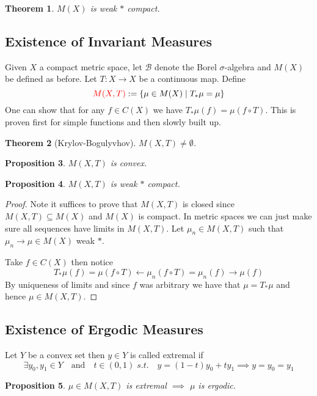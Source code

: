 \documentclass[11pt]{article}
\newcommand{\defeq}{:=}
\newcommand{\relmiddle}[1]{\mathrel{}\middle#1\mathrel{}}
\newcommand{\rmv}{\relmiddle|}
\newenvironment{defin}
	{\begin{mdframed}[backgroundcolor=white, roundcorner=5pt, linewidth=1pt]}
	{\end{mdframed}}
\newcommand{\mdf}[1]{{\color{red} #1}}
\newtheorem{prop}{Proposition}[section]
\newtheorem{theorem}[prop]{Theorem}
\begin{document}
\begin{theorem}
$M(X)$ is weak $\ast$ compact.
\end{theorem}

\subsection{Existence of Invariant Measures}
Given $X$ a compact metric space, let $\mathcal{B}$ denote the Borel $\sigma$-algebra and $M(X)$ be defined as before.
Let $T:X\to X$ be a continuous map.
Define
\[
	\mdf{M(X, T)}\defeq \left\{ \mu\in M(X) \rmv T_\ast \mu = \mu\right\}
\]
One can show that for any $f\in C(X)$ we have $T_\ast\mu(f) = \mu(f\circ T)$.
This is proven first for simple functions and then slowly built up.

\begin{theorem}[Krylov-Bogulyvhov]
$M(X, T)\neq \emptyset$.
\end{theorem}

\begin{prop}
$M(X, T)$ is convex.
\end{prop}

\begin{prop}
$M(X, T)$ is weak $\ast$ compact.
\end{prop}

\begin{proof}
Note it suffices to prove that $M(X, T)$ is closed since $M(X, T)\subseteq M(X)$ and $M(X)$ is compact.
In metric spaces we can just make sure all sequences have limits in $M(X, T)$.
Let $\mu_n\in M(X, T)$ such that $\mu_n \to \mu\in M(X)$ weak $\ast$.

Take $f\in C(X)$ then notice
\[
	T_\ast\mu(f) = \mu(f\circ T) \leftarrow \mu_n (f\circ T) = \mu_n (f) \to \mu(f)
\]
By uniqueness of limits and since $f$ was arbitrary we have that $\mu = T_\ast \mu$ and hence $\mu\in M(X, T)$.
\end{proof}

\subsection{Existence of Ergodic Measures}
\begin{defin}
 Let $Y$ be a convex set then $y\in Y$ is called \mdf{extremal} if
 \[
 \exists y_0, y_1 \in Y \quad \text{and} \quad t\in (0, 1)\; s.t. \quad y = (1-t)y_0 + ty_1 \implies y=y_0=y_1
 \]
\end{defin}

\begin{prop}
$\mu\in M(X, T)$ is extremal $\implies$ $\mu$ is ergodic.
\end{prop}
\end{document}
